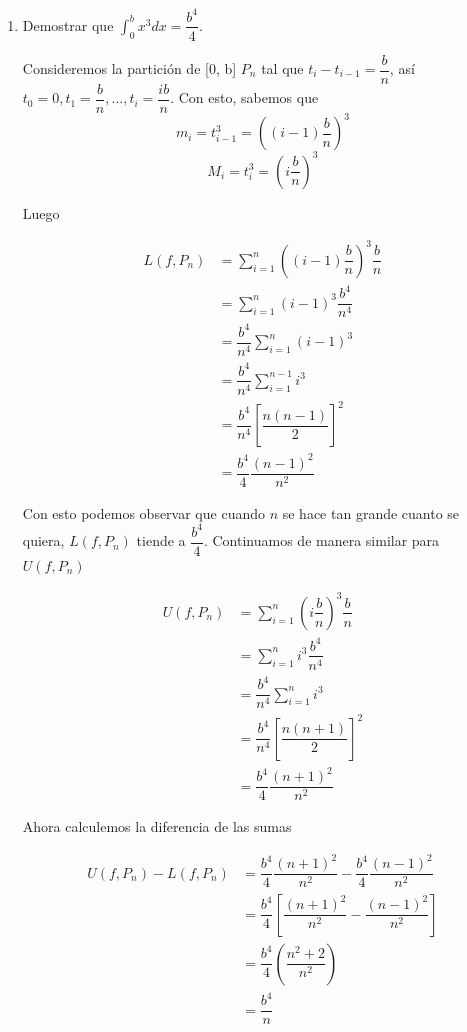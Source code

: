 \documentclass{report}
\begin{document}
    \begin{enumerate}[label=\textcolor{NavyBlue}{\textbf{\arabic*.}}]
        \item Demostrar que $\int_{0}^{b}x^3dx = \dfrac{b^4}{4}$.

        Consideremos la partición de [0, b] $P_n$ tal que $t_i - t_{i-1} = \dfrac{b}{n}$, así $t_0 = 0, t_1 = \dfrac{b}{n}, \dots , t_i =\dfrac{ib}{n}$. Con esto, sabemos que
        $$m_i = t_{i-1}^3 = \left((i-1)\dfrac{b}{n}\right)^3$$
        $$M_i = t_{i}^3 = \left(i\dfrac{b}{n}\right)^3$$

        Luego

        \begin{align*}
            L(f, P_n) &= \sum_{i=1}^{n}\left((i-1)\dfrac{b}{n}\right)^3\dfrac{b}{n}\\
            &= \sum_{i=1}^{n}(i-1)^3\dfrac{b^4}{n^4}\\
            &= \dfrac{b^4}{n^4} \sum_{i=1}^{n}(i-1)^3\\
            &= \dfrac{b^4}{n^4} \sum_{i=1}^{n-1}i^3\\
            &= \dfrac{b^4}{n^4} \left[\dfrac{n(n-1)}{2}\right]^2\\
            &= \dfrac{b^4}{4} \dfrac{(n-1)^2}{n^2}
        \end{align*}

        Con esto podemos observar que cuando $n$ se hace tan grande cuanto se quiera, $L(f, P_n)$ tiende a $\dfrac{b^4}{4}$. Continuamos de manera similar para $U(f, P_n)$

        \begin{align*}
            U(f, P_n) &= \sum_{i=1}^{n}\left(i\dfrac{b}{n}\right)^3\dfrac{b}{n}\\
            &= \sum_{i=1}^{n}i^3\dfrac{b^4}{n^4}\\
            &= \dfrac{b^4}{n^4} \sum_{i=1}^{n}i^3\\
            &= \dfrac{b^4}{n^4} \left[\dfrac{n(n+1)}{2}\right]^2\\
            &= \dfrac{b^4}{4} \dfrac{(n+1)^2}{n^2}
        \end{align*}

        Ahora calculemos la diferencia de las sumas

        \begin{align*}
            U(f, P_n) - L(f, P_n) &= \dfrac{b^4}{4} \dfrac{(n+1)^2}{n^2} - \dfrac{b^4}{4} \dfrac{(n-1)^2}{n^2}\\
            &= \dfrac{b^4}{4} \left[\dfrac{(n+1)^2}{n^2} - \dfrac{(n-1)^2}{n^2}\right]\\
            &= \dfrac{b^4}{4} \left(\dfrac{n^2+2}{n^2}\right)\\
            &= \dfrac{b^4}{n}
        \end{align*}


\end{enumerate}
\end{document}
